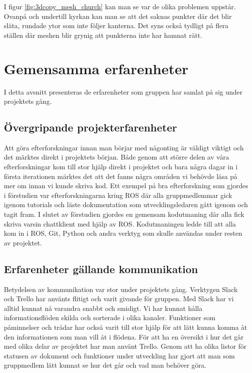 I figur \ref{fig:3dcopy_mesh_church} kan man se var de olika problemen uppstår. Ovanpå och undertill kyrkan kan man se att det saknas punkter där det blir släta, rundade ytor som inte följer kanterna. Det syns också tydligt på flera ställen där meshen blir grynig att punkterna inte har hamnat rätt.

\section{Gemensamma erfarenheter}

I detta avsnitt presenteras de erfarenheter som gruppen har samlat på sig under projektets gång.

\subsection{Övergripande projekterfarenheter}

Att göra efterforskningar innan man börjar med någonting är väldigt viktigt och det märktes direkt i projektets början. Både genom att större delen av våra efterforskningar kom till stor hjälp direkt i projektet och bara några dagar in i första iterationen märktes det att det fanns några områden vi behövde läsa på mer om innan vi kunde skriva kod. Ett exempel på bra efterforskning som gjordes i förstudien var efterforskningarna kring ROS där alla gruppmedlemmar gick igenom tutorials och läste dokumentation som utvecklingsledaren gått igenom och tagit fram. I slutet av förstudien gjordes en gemensam kodutmaning där alla fick skriva varsin chattklient med hjälp av ROS. Kodutmaningen ledde till att alla kom in i ROS, Git, Python och andra verktyg som skulle användas under resten av projektet.


\subsection{Erfarenheter gällande kommunikation}

Betydelsen av kommunikation var stor under projektets gång. Verktygen Slack och Trello har använts flitigt och varit givande för gruppen. Med Slack har vi alltid kunnat nå varandra snabbt och smidigt. Vi har kunnat hålla informationsflöden skilda och sorterade i olika kanaler. Funktioner som påminnelser och trådar har också varit till stor hjälp för att lätt kunna komma åt den informationen som man vill åt i flödena. För att ha en översikt i hur det går med olika delar av projektet har man använt Trello. Genom att ha olika listor för statusen av dokument och funktioner under utveckling har gjort att man som gruppmedlem lätt kunnat se hur det går och vad man behöver göra. 



